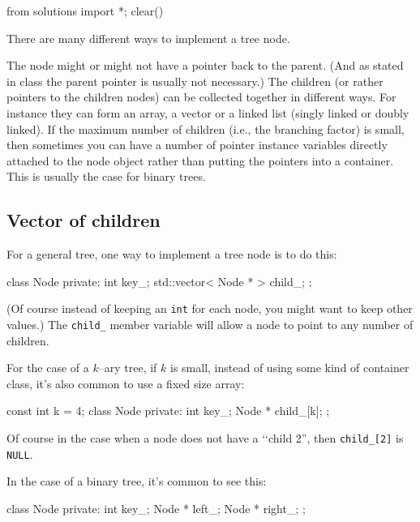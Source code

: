 \begin{python0}
from solutions import *; clear()
\end{python0}


There are many different ways to implement a tree node.
\begin{tightlist}
  \li The node might or might not have a pointer back to the parent. (And as stated
  in class the parent pointer is usually not necessary.)
  \li The children (or rather pointers to the children nodes) can be
  collected together in different ways.
  For instance they can form an array, a vector or a linked list (singly linked or doubly
  linked). If the maximum number of children (i.e., the branching factor)
  is small, then sometimes you can have a number of pointer instance variables
  directly attached to the node object rather than putting the pointers
  into a container.
  This is usually the case for binary trees.
\end{tightlist}

\newpage
\subsection{Vector of children}

For a general tree, one way to implement a tree node is to do this:
\begin{console}
class Node 
{
private:
    int key_;
    std::vector< Node * > child_;
};
\end{console}
(Of course instead of keeping an \verb!int! for each node, you might
want to keep other values.)
The \verb!child_! member variable will allow a node to point to any number
of children.

For the case of a $k$--ary tree, if $k$ is small,
instead of using some kind of container class, 
it's also common to use a fixed size array:
\begin{console}
const int k = 4;
class Node 
{
private:
    int key_;
    Node * child_[k];
};
\end{console}
Of course in the case when a node does not have a \lq\lq child 2'',
then \verb!child_[2]! is \verb!NULL!.

In the case of a binary tree, it's common to see this:
\begin{console}
class Node 
{
private:
    int key_;
    Node * left_;
    Node * right_;
};
\end{console}

